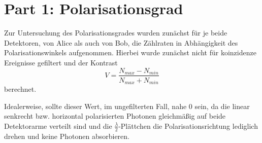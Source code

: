 \documentclass[12pt,a4paper]{article}
\begin{document}
	\section{Part 1: Polarisationsgrad}
	Zur Untersuchung des Polarisationsgrades wurden zunächst
	für je beide Detektoren, von Alice als auch von
	Bob, die Zählraten in Abhängigkeit des Polarisationswinkels
	aufgenommen. Hierbei wurde zunächst nicht für koinzidenze Ereignisse
	gefiltert und der Kontrast
	\begin{equation}
		V = \frac{N_{max} - N_{min}}{N_{max} + N_{min}} \label{eq:1}
	\end{equation}
	berechnet.

	Idealerweise, sollte dieser Wert, im ungefilterten Fall, nahe \(0\) sein,
	da die linear senkrecht bzw. horizontal polarisierten Photonen gleichmäßig auf beide Detektorarme verteilt sind
	und die \(\frac{\lambda}{2}\)-Plättchen die Polarisationsrichtung lediglich drehen und keine Photonen absorbieren.
	\newline
\end{document}
